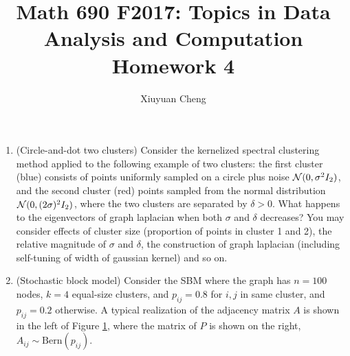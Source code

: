 \documentclass[english]{article}
\begin{document}
\title{Math 690 F2017: Topics in Data Analysis and Computation\\
Homework 4}

\author{Xiuyuan Cheng}
\date{}

\maketitle

\begin{enumerate}

\item
(Circle-and-dot two clusters)
%
Consider the kernelized spectral clustering method applied to the following example of two clusters:  the first cluster (blue) consists of points uniformly sampled on a circle plus noise ${\cal N}(0,\sigma^2 I_2)$, and the second cluster (red) points sampled from the normal distribution ${\cal N}(0,(2\sigma)^2 I_2)$, where the two clusters are separated by $\delta > 0$. What happens to the eigenvectors of graph laplacian when both $\sigma$ and $\delta$ decreases? You may consider effects of cluster size (proportion of points in cluster 1 and 2), the relative magnitude of $\sigma$ and $\delta$, the construction of graph laplacian (including self-tuning of width of gaussian kernel) and so on.


\begin{figure}[h]
\label{fig:1}
\end{figure}



\item
(Stochastic block model)
%
Consider the SBM where the graph has $n=100$ nodes, $k=4$ equal-size clusters, and $p_{ij}=0.8$ for $i,j$ in same cluster, and $p_{ij}=0.2$ otherwise.
A typical realization of the adjacency matrix $A$ is shown in the left of Figure \ref{fig:1}, 
where the matrix of $P$ is shown on the right, $A_{ij} \sim \text{Bern}(p_{ij})$.


\end{enumerate}
\end{document}
